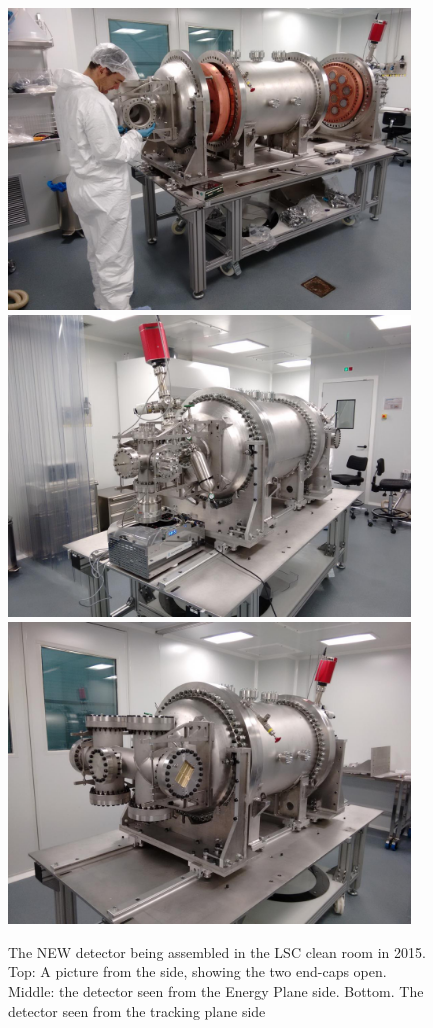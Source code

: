 \begin{figure}[hpt!]
\centering
\includegraphics[height=8cm]{img/NewInCRWIthAlberto.png}
\includegraphics[height=8cm]{img/NewSeenFromEP.png}
\includegraphics[height=8cm]{img/NewSeenFromTP.png}

\caption{The NEW detector being assembled in the LSC clean room in 2015. Top: A picture from the side, showing the two end-caps open. Middle: the detector seen from the Energy Plane side. Bottom. The detector seen from the tracking plane side} \label{fig.New}
\end{figure}


